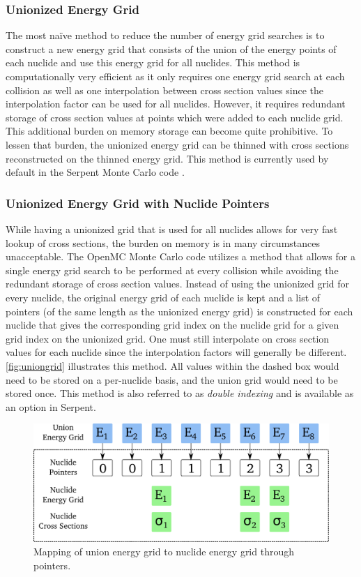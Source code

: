 \subsubsection{Unionized Energy Grid}

The most naïve method to reduce the number of energy grid searches is to
construct a new energy grid that consists of the union of the energy points of
each nuclide and use this energy grid for all nuclides. This method is
computationally very efficient as it only requires one energy grid search at
each collision as well as one interpolation between cross section values since
the interpolation factor can be used for all nuclides. However, it requires
redundant storage of cross section values at points which were added to each
nuclide grid. This additional burden on memory storage can become quite
prohibitive. To lessen that burden, the unionized energy grid can be thinned
with cross sections reconstructed on the thinned energy grid. This method is
currently used by default in the Serpent Monte Carlo code
\cite{vtt-leppanen-2012}.

\subsubsection{Unionized Energy Grid with Nuclide Pointers}

While having a unionized grid that is used for all nuclides allows for very fast
lookup of cross sections, the burden on memory is in many circumstances
unacceptable. The OpenMC Monte Carlo code utilizes a method that allows for a
single energy grid search to be performed at every collision while avoiding the
redundant storage of cross section values. Instead of using the unionized grid
for every nuclide, the original energy grid of each nuclide is kept and a list
of pointers (of the same length as the unionized energy grid) is constructed for
each nuclide that gives the corresponding grid index on the nuclide grid for a
given grid index on the unionized grid. One must still interpolate on cross
section values for each nuclide since the interpolation factors will generally
be different. \autoref{fig:uniongrid} illustrates this method. All values within
the dashed box would need to be stored on a per-nuclide basis, and the union
grid would need to be stored once. This method is also referred to as
\emph{double indexing} \cite{ane-leppanen-2009} and is available as an option in
Serpent.
\begin{figure}[htb]
  \centering
  \includegraphics[width=6.0in]{figures/ch2/uniongrid.pdf}
  \caption{Mapping of union energy grid to nuclide energy grid through
    pointers.}
  \label{fig:uniongrid}
\end{figure}

